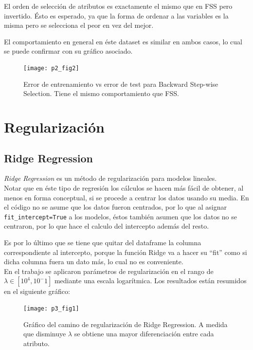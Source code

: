 \documentclass[letter, 10pt]{article}
\begin{document}
El orden de selección de atributos es exactamente el mismo que en FSS pero
invertido. Ésto es esperado, ya que la forma de ordenar a las variables es la
misma pero se selecciona el peor en vez del mejor.

El comportamiento en general en éste dataset es similar en ambos casos, lo cual
se puede confirmar con su gráfico asociado.

\begin{figure}[H]
  \centering
 \texttt{[image: p2\_fig2]} 
  \caption{Error de entrenamiento vs error de test para Backward Step-wise
    Selection. Tiene el mismo comportamiento que FSS.}
  \label{fig:p2_g2}
\end{figure}
\section{Regularización}

\subsection{Ridge Regression}
\textit{Ridge Regression} es un método de regularización para modelos
lineales.\\

Notar que en éste tipo de regresión los cálculos se hacen más fácil de obtener,
al menos en forma conceptual, si se procede a centrar los datos usando su media.
En el código no se asume que los datos fueron centrados, por lo que al asignar
\texttt{fit_intercept=True} a los modelos, éstos también asumen que los datos no
se centraron, por lo que hace el calculo del intercepto además del resto.


Es por lo último que se tiene que quitar del dataframe la columna
correspondiente al intercepto, porque la función Ridge va a hacer su ``fit''
como si dicha columna fuera un dato más, lo cual no es conveniente.\\


En el trabajo se aplicaron parámetros de regularización en el rango de $\lambda
\in [10^4,10^-1]$ mediante una escala logarítmica. Los resultados están resumidos
en el siguiente gráfico:

\begin{figure}[H]
  \centering
  \texttt{[image: p3\_fig1]} 
  \caption{Gráfico del camino de regularización de Ridge Regression. A medida
    que disminuye $\lambda$ se obtiene una mayor diferenciación entre cada atributo.}
  \label{fig:p3_g1}
\end{figure}
\end{document}
